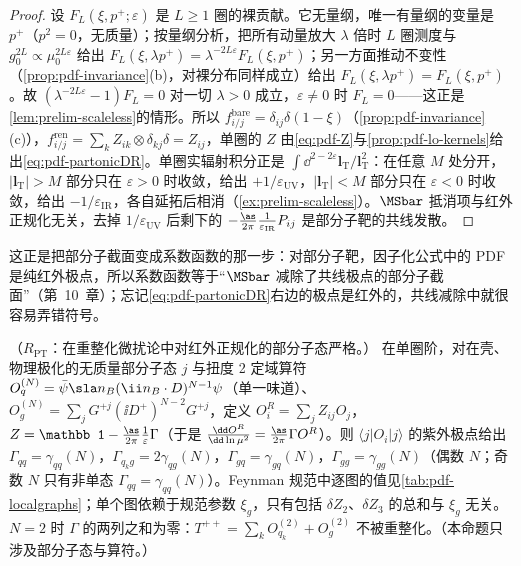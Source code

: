 \begin{proof}
设 $F_L(\xi,p^+;\varepsilon)$ 是 $L\ge1$ 圈的裸贡献。它无量纲，唯一有量纲的变量是 $p^+$（$p^2=0$，无质量）；按量纲分析，把所有动量放大 $\lambda$ 倍时 $L$ 圈测度与 $g_0^{2L}\propto\mu_0^{2L\varepsilon}$ 给出 $F_L(\xi,\lambda p^+)=\lambda^{-2L\varepsilon}F_L(\xi,p^+)$；另一方面推动不变性（\cref{prop:pdf-invariance}(b)，对裸分布同样成立）给出 $F_L(\xi,\lambda p^+)=F_L(\xi,p^+)$。故 $(\lambda^{-2L\varepsilon}-1)F_L=0$ 对一切 $\lambda>0$ 成立，$\varepsilon\ne0$ 时 $F_L=0$——这正是\cref{lem:prelim-scaleless}的情形。所以 $f^{\mathrm{bare}}_{i/j}=\delta_{ij}\delta(1-\xi)$（\cref{prop:pdf-invariance}(c)），$f^{\mathrm{ren}}_{i/j}=\sum_kZ_{ik}\otimes\delta_{kj}\delta=Z_{ij}$，单圈的 $Z$ 由\cref{eq:pdf-Z}与\cref{prop:pdf-lo-kernels}给出\cref{eq:pdf-partonicDR}。单圈实辐射积分正是 $\int\dd^{2-2\varepsilon}\bm l_{\mathrm T}/\bm l_{\mathrm T}^2$：在任意 $M$ 处分开，$|\bm l_{\mathrm T}|>M$ 部分只在 $\varepsilon>0$ 时收敛，给出 $+1/\varepsilon_{\mathrm{UV}}$，$|\bm l_{\mathrm T}|<M$ 部分只在 $\varepsilon<0$ 时收敛，给出 $-1/\varepsilon_{\mathrm{IR}}$，各自延拓后相消（\cref{ex:prelim-scaleless}）。$\MSbar$ 抵消项与红外正规化无关，去掉 $1/\varepsilon_{\mathrm{UV}}$ 后剩下的 $-\frac{\as}{2\pi}\frac1{\varepsilon_{\mathrm{IR}}}P_{ij}$ 是部分子靶的共线发散。
\end{proof}

这正是把部分子截面变成系数函数的那一步：对部分子靶，因子化公式中的 PDF 是纯红外极点，所以系数函数等于“$\MSbar$ 减除了共线极点的部分子截面”（第~10~章）；忘记\cref{eq:pdf-partonicDR}右边的极点是红外的，共线减除中就很容易弄错符号。

\begin{proposition}\label{prop:pdf-local-anomalous}
（$R_{\mathrm{PT}}$：在重整化微扰论中对红外正规化的部分子态严格。）
在单圈阶，对在壳、物理极化的无质量部分子态 $j$ 与扭度 2 定域算符 $O_q^{(N)}=\bar\psi\sla n_B(\ii n_B\cdot D)^{N-1}\psi$（单一味道）、$O_g^{(N)}=\sum_jG^{+j}(\ii D^+)^{N-2}G^{+j}$，定义 $O_i^R=\sum_jZ_{ij}O_j$，$Z=\mathbb 1-\frac{\as}{2\pi}\frac1\varepsilon\Gamma$（于是 $\frac{\dd O^R}{\dd\ln\mu^2}=\frac{\as}{2\pi}\Gamma O^R$）。则 $\langle j|O_i|j\rangle$ 的紫外极点给出 $\Gamma_{qq}=\gamma_{qq}(N)$，$\Gamma_{q_kg}=2\gamma_{qg}(N)$，$\Gamma_{gq}=\gamma_{gq}(N)$，$\Gamma_{gg}=\gamma_{gg}(N)$（偶数 $N$；奇数 $N$ 只有非单态 $\Gamma_{qq}=\gamma_{qq}(N)$）。Feynman 规范中逐图的值见\cref{tab:pdf-localgraphs}；单个图依赖于规范参数 $\xi_g$，只有包括 $\delta Z_2$、$\delta Z_3$ 的总和与 $\xi_g$ 无关。$N=2$ 时 $\Gamma$ 的两列之和为零：$T^{++}=\sum_kO^{(2)}_{q_k}+O^{(2)}_g$ 不被重整化。（本命题只涉及部分子态与算符。）
\end{proposition}

